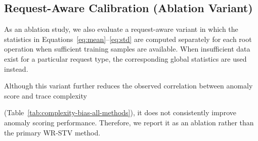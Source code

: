 \subsection{Request-Aware Calibration (Ablation Variant)}

As an ablation study, we also evaluate a request-aware variant in which
the statistics in Equations~\ref{eq:mean}--\ref{eq:std} are computed
separately for each root operation when sufficient training samples are
available. When insufficient data exist for a particular request type,
the corresponding global statistics are used instead.

Although this variant further reduces the observed correlation between
anomaly score and trace complexity

(Table~\ref{tab:complexity-bias-all-methods}), it does not consistently improve
anomaly scoring performance. Therefore, we report it as an ablation
rather than the primary WR-STV method.
